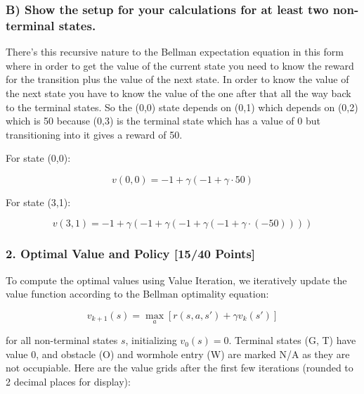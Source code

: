 \documentclass{article}
\begin{document}
\subsubsection*{B) Show the setup for your calculations for at least two non-terminal states.}

There's this recursive nature to the Bellman expectation equation in this form where in order to get the value of the current state you need to know the reward for the transition plus the value of the next state.
In order to know the value of the next state you have to know the value of the one after that all the way back to the terminal states.
So the (0,0) state depends on (0,1) which depends on (0,2) which is 50 because (0,3) is the terminal state which has a value of 0 but transitioning into it gives a reward of 50.

For state (0,0):

\[
v(0,0) = -1 + \gamma \left( -1 + \gamma \cdot 50 \right)
\]

For state (3,1):

\[
v(3,1) = -1 + \gamma \left( -1 + \gamma \left( -1 + \gamma \left( -1 + \gamma \cdot (-50) \right) \right) \right)
\]

\subsubsection*{2. Optimal Value and Policy [15/40 Points]}

To compute the optimal values using Value Iteration, we iteratively update the value function according to the Bellman optimality equation:

\begin{equation}
v_{k+1}(s) = \max_a \left[ r(s, a, s') + \gamma v_k(s') \right]
\end{equation}

for all non-terminal states $s$, initializing $v_0(s) = 0$. Terminal states (G, T) have value 0, and obstacle (O) and wormhole entry (W) are marked N/A as they are not occupiable. Here are the value grids after the first few iterations (rounded to 2 decimal places for display):
\end{document}
